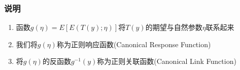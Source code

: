 \subsubsection{说明}
\begin{enumerate}
	\item 函数$g(\eta) = E\left[E(T(y);\eta)\right]$将$T(y)$的期望与自然参数$\eta$联系起来
	\item 我们将$g(\eta)$称为正则响应函数(Canonical Response Function)
	\item 将$g(\eta)$的反函数$g^{-1}(y)$称为正则关联函数(Canonical Link Function)
\end{enumerate}



% 




















